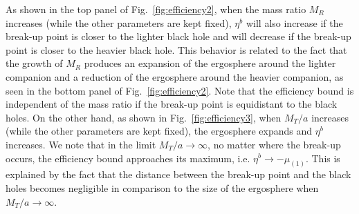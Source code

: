 As shown in the top panel of Fig.~\ref{fig:efficiency2}, when the mass ratio $M_R$ increases (while the other parameters are kept fixed), $\eta ^{b}$ will also increase if the break-up point is closer to the lighter black hole and will decrease if the break-up point is closer to the heavier black hole. This behavior is related to the fact that the growth of $M_R$ produces an expansion of the ergosphere around the lighter companion and a reduction of the ergosphere around the heavier companion, as seen in the bottom panel of Fig.~\ref{fig:efficiency2}.
Note that the efficiency bound is independent of the mass ratio if the break-up point is equidistant to the black holes.
On the other hand, as shown in Fig.~\ref{fig:efficiency3}, when $M_T/a$ increases (while the other parameters are kept fixed), the ergosphere expands and $\eta ^{b}$ increases. We note that in the limit $M_T/a \rightarrow \infty$, no matter where the break-up occurs, the efficiency bound approaches its maximum, i.e. $\eta ^{b} \rightarrow - \mu_{(1)}$. This is explained by the fact that the distance between the break-up point and the black holes becomes negligible in comparison to the size of the ergosphere when $M_T/a \rightarrow \infty$.

